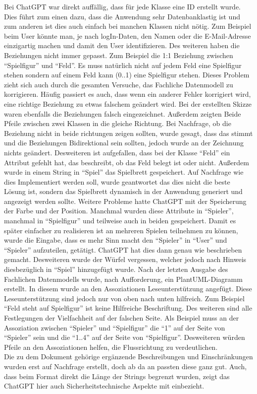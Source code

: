 Bei ChatGPT war direkt auffällig, dass für jede Klasse eine ID erstellt wurde. Dies führt zum einen dazu, dass die Anwendung sehr Datenbanklastig ist und zum 
anderen ist dies auch einfach bei manchen Klassen nicht nötig. Zum Beispiel beim User könnte man, je nach logIn-Daten, den Namen oder die E-Mail-Adresse 
einzigartig machen und damit den User identifizieren. Des weiteren haben die Beziehungen nicht immer gepasst. Zum Beispiel die 1:1 Beziehung zwischen 
``Spielfigur'' und ``Feld''. Es muss natürlich nicht auf jedem Feld eine Spielfigur stehen sondern auf einem Feld kann (0..1) eine Spielfigur stehen. Dieses Problem
zieht sich auch durch die gesamten Versuche, das Fachliche Datenmodell zu korrigieren. Häufig passiert es auch, dass wenn ein anderer Fehler korrigiert wird, 
eine richtige Beziehung zu etwas falschem geändert wird. Bei der erstellten Skizze waren ebenfalls die Beziehungen falsch eingezeichnet. Außerdem zeigten Beide Pfeile 
zwischen zwei Klassen in die gleiche Richtung. Bei Nachfrage, ob die Beziehung nicht in beide richtungen zeigen sollten, wurde gesagt, dass das stimmt und die 
Beziehungen Bidirektional sein sollten, jedoch wurde an der Zeichnung nichts geändert. Desweiteren ist aufgefallen, dass bei der Klasse ``Feld'' ein Attribut gefehlt
hat, das beschreibt, ob das Feld belegt ist oder nicht. Außerdem wurde in einem String in ``Spiel'' das Spielbrett gespeichert. Auf Nachfrage wie dies Implementiert
werden soll, wurde geantwortet das dies nicht die beste Lösung ist, sondern das Spielbrett dynamisch in der Anwendung generiert und angezeigt werden sollte.
Weitere Probleme hatte ChatGPT mit der Speicherung der Farbe und der Position. Manchmal wurden diese Attribute in ``Spieler'', manchmal in ``Spielfigur'' und teilweise
auch in beiden gespeichert. Damit es später einfacher zu realisieren ist an mehreren Spielen teilnehmen zu können, wurde die Eingabe, dass es mehr Sinn macht den 
``Spieler'' in ``User'' und ``Spieler'' aufzuteilen, getätigt. ChatGPT hat dies dann genau wie beschrieben gemacht. Desweiteren wurde der Würfel vergessen, welcher 
jedoch nach Hinweis diesbezüglich in ``Spiel'' hinzugefügt wurde. Nach der letzten Ausgabe des Fachlichen Datenmodells wurde, nach Aufforderung, ein PlantUML-Diagramm 
erstellt. In diesem wurde an den Assoziationen Leseunterstützung angefügt. Diese Leseunterstützung sind jedoch nur von oben nach unten hilfreich. Zum Beispiel ``Feld 
steht auf Spielfigur'' ist keine Hilfreiche Beschriftung. Des weiteren sind alle Festlegungen der Vielfachheit auf der falschen Seite. Als Beispiel muss an der 
Assoziation zwischen ``Spieler'' und ``Spielfigur'' die ``1'' auf der Seite von ``Spieler'' sein und die ``1..4'' auf der Seite von ``Spielfigur''. Desweiteren würden 
Pfeile an den Assoziationen helfen, die Flussrichtung zu verdeutlichen.\\
Die zu dem Dokument gehörige ergänzende Beschreibungen und Einschränkungen wurden erst auf Nachfrage erstellt, doch ab da an passten diese ganz gut. Auch, dass beim 
Format direkt die Länge der Strings begrenzt wurden, zeigt das ChatGPT hier auch Sicherheitstechnische Aspekte mit einbezieht.\\

